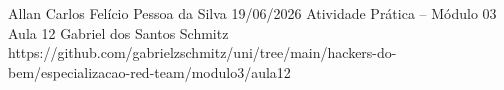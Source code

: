 \documentclass{article}
\begin{document}
{Allan Carlos Felício Pessoa da Silva}
{19/06/2026}
{Atividade Prática -- Módulo 03}
{Aula 12}
{Gabriel dos Santos Schmitz}
{https://github.com/gabrielzschmitz/uni/tree/main/hackers-do-bem/especializacao-red-team/modulo3/aula12}





\newpage
\printbibliography[title=Referências]
\end{document}

